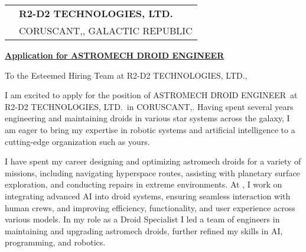 \documentclass[10pt, a4paper]{article}
\begin{document}
\vspace{3cm}
\bigskip
\bigskip

\newcommand{\COMPANY}{R2-D2 TECHNOLOGIES, LTD.}
\newcommand{\ROLE}{ASTROMECH DROID ENGINEER}
\newcommand{\JobPostingURL}{https://www.esa.int/About_Us/Careers_at_ESA/Apply_now_to_become_an_ESA_astronaut}
\newcommand{\CITY}{CORUSCANT,}
\newcommand{\COUNTRY}{GALACTIC REPUBLIC}

\begin{tabular}{@{}p{0cm}l@{}} 
 & \textbf{\COMPANY} \\[0.8ex] 
 & \CITY, \COUNTRY
\end{tabular}

\bigskip %

\hfill {}

\noindent \textbf{\underline{Application for \href{\JobPostingURL}{\ROLE}}}

To the Esteemed Hiring Team at \COMPANY,

\bigskip

I am excited to apply for the position of \ROLE\ at \COMPANY\ in \CITY. Having spent several years engineering and maintaining droids in various star systems across the galaxy, I am eager to bring my expertise in robotic systems and artificial intelligence to a cutting-edge organization such as yours.

I have spent my career designing and optimizing astromech droids for a variety of missions, including navigating hyperspace routes, assisting with planetary surface exploration, and conducting repairs in extreme environments. At \currentEmployer, I work on integrating advanced AI into droid systems, ensuring seamless interaction with human crews, and improving efficiency, functionality, and user experience across various models. In my role as a Droid Specialist I led a team of engineers in maintaining and upgrading astromech droids, further refined my skills in AI, programming, and robotics.
\end{document}
